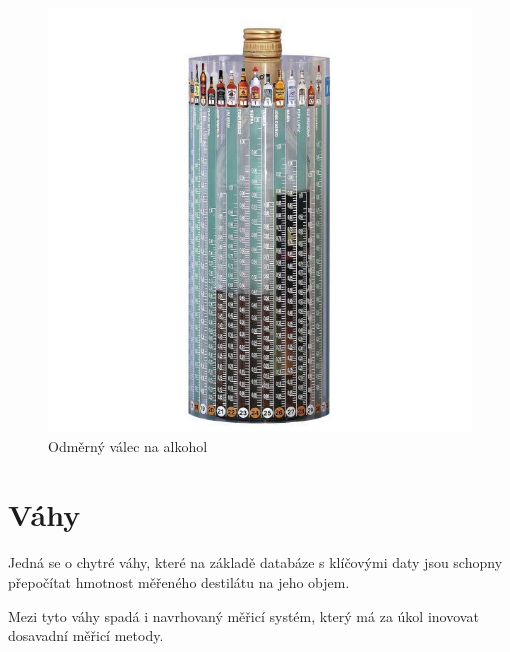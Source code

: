 \begin{figure}[!h]
    \begin{center}
        \includegraphics[scale=0.35]{obrazky/odměrný válec na alkohol.jpg}
    \end{center}
    \caption{Odměrný válec na alkohol \cite{Odměrný válec na alkohol}}
\end{figure}


\section{Váhy}

Jedná se o chytré váhy, které na základě databáze s klíčovými daty jsou schopny přepočítat hmotnost měřeného destilátu na jeho objem. 

Mezi tyto váhy spadá i navrhovaný měřicí systém, který má za úkol inovovat dosavadní měřicí metody.


%
%
